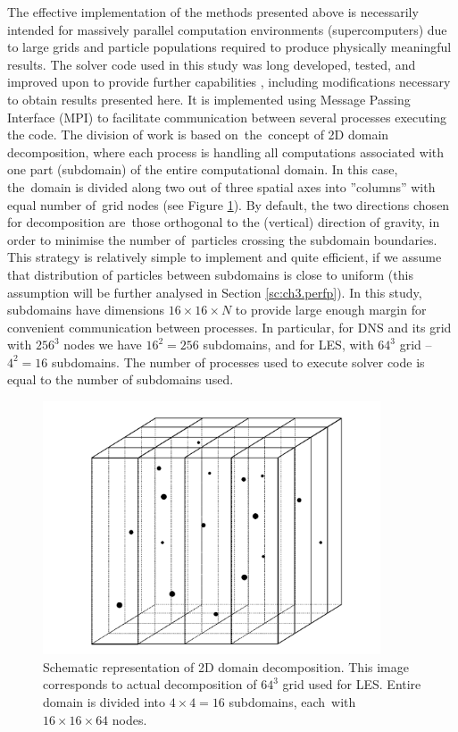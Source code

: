 \documentclass{pracamgren}
\begin{document}
The effective implementation of the methods presented above is necessarily intended for massively parallel computation environments (supercomputers) due to large grids and particle populations required to produce physically meaningful results.
The solver code used in this study was long developed, tested, and improved upon to provide further capabilities \parencite[see~e.g.][]{Ayala2014,Parishani2015}, including modifications necessary to obtain results presented here.
It is implemented using Message Passing Interface (MPI) to facilitate communication between several processes executing the code.
The division of work is based on~the~concept of 2D domain decomposition, where each process is handling all computations associated with one part (subdomain) of the entire computational domain.
In this case, the~domain is divided along two out of three spatial axes into ''columns'' with equal number of~grid nodes (see Figure \ref{fig:2dd}).
By default, the two directions chosen for decomposition are~those orthogonal to the (vertical) direction of gravity, in order to minimise the number of~particles crossing the subdomain boundaries. 
This strategy is relatively simple to implement and quite efficient, if we assume that distribution of particles between subdomains is close to uniform (this assumption will be further analysed in Section \ref{sc:ch3.perfp}).
In this study, subdomains have dimensions $16 \times 16 \times N$ to provide large enough margin for convenient communication between processes.
In particular, for DNS and its grid with $256^{3}$ nodes we have $16^{2} = 256$ subdomains, and for LES, with $64^{3}$ grid -- $4^{2} = 16$ subdomains.
The number of processes used to execute solver code is equal to the number of subdomains used.

\begin{figure}[h]
\centering
\includegraphics[width=10cm]{img/figs/2dd.pdf}
\caption{
Schematic representation of 2D domain decomposition. This image corresponds to actual decomposition of $64^{3}$ grid used for LES. Entire domain is divided into $4 \times 4 = 16$ subdomains, each~with~$16 \times 16 \times 64$ nodes.
}
\label{fig:2dd}
\end{figure}
\end{document}
